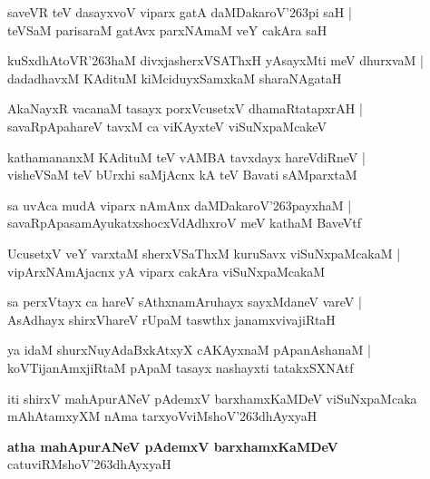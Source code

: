 \begin{shloka}
saveVR teV dasayxvoV viparx gatA daMDakaroV\char'263pi saH |\\
teVSaM parisaraM gatAvx parxNAmaM veY cakAra saH 
\end{shloka}

\begin{shloka}
kuSxdhAtoVR\char'263haM divxjasherxVSAThxH yAsayxMti meV dhurxvaM |\\
dadadhavxM KAdituM kiMciduyxSamxkaM sharaNAgataH
\end{shloka}

\begin{shloka}
AkaNayxR vacanaM tasayx porxVcusetxV dhamaRtatapxrAH |\\
savaRpApahareV tavxM ca viKAyxteV viSuNxpaMcakeV 
\end{shloka}

\begin{shloka}
kathamananxM KAdituM teV vAMBA tavxdayx hareVdiRneV |\\
visheVSaM teV bUrxhi saMjAcnx kA teV Bavati sAMparxtaM
\end{shloka}

\begin{shloka}
sa uvAca mudA viparx nAmAnx daMDakaroV\char'263payxhaM |\\
savaRpApasamAyukatxshocxVdAdhxroV meV kathaM BaveVtf
\end{shloka}

\begin{shloka}
UcusetxV veY varxtaM sherxVSaThxM kuruSavx viSuNxpaMcakaM |\\
vipArxNAmAjacnx yA viparx cakAra viSuNxpaMcakaM 
\end{shloka}

\begin{shloka}
sa perxVtayx ca hareV sAthxnamAruhayx sayxMdaneV vareV |\\
AsAdhayx shirxVhareV rUpaM taswthx janamxvivajiRtaH
\end{shloka}

\begin{shloka}
ya idaM shurxNuyAdaBxkAtxyX cAKAyxnaM pApanAshanaM |\\
koVTijanAmxjiRtaM pApaM tasayx nashayxti tatakxSXNAtf
\end{shloka}
iti shirxV mahApurANeV pAdemxV barxhamxKaMDeV viSuNxpaMcaka mAhAtamxyXM nAma tarxyoVviMshoV\char'263dhAyxyaH 

\begin{center}
\textbf{\large atha mahApurANeV pAdemxV barxhamxKaMDeV}\\
catuviRMshoV\char'263dhAyxyaH
\end{center}

